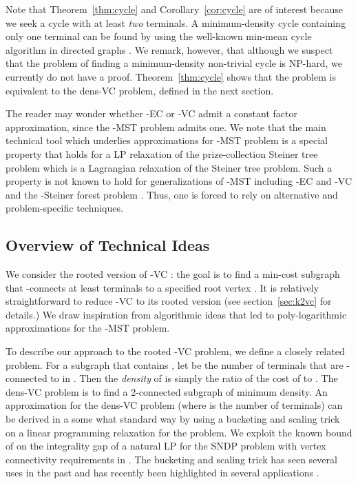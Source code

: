 \documentclass[11pt]{article}
\newcommand{\kec}[1]{-{\sc EC} }
\newcommand{\kvc}[1]{-{\sc VC} }
\newcommand{\ke}{\kec{2}}
\newcommand{\kv}{\kvc{2}}
\newcommand{\densV}{dens-{\sc VC} }
\begin{document}
Note that Theorem~\ref{thm:cycle} and Corollary~\ref{cor:cycle} are of
interest because we seek a cycle with at least {\em two} terminals.  A
minimum-density cycle containing only one terminal can be found by
using the well-known min-mean cycle algorithm in directed graphs
\cite{networkflows_book}.  We remark, however, that although we
suspect that the problem of finding a minimum-density non-trivial
cycle is NP-hard, we currently do not have a proof.
Theorem~\ref{thm:cycle} shows that the problem is equivalent to the
\densV problem, defined in the next section.

\smallskip
{} The reader may wonder whether \ke or \kv admit
a constant factor approximation, since the -MST problem admits one.
We note that the main technical tool which underlies 
approximations for -MST problem \cite{BlumRV96,Garg96,ChudakRW} is
a special property that holds for a LP relaxation of the
prize-collection Steiner tree problem \cite{GoemansW96} which is a
Lagrangian relaxation of the Steiner tree problem. Such a property is
not known to hold for generalizations of -MST including \ke and \kv
and the -Steiner forest problem \cite{HajiaghayiJ}. Thus, one is
forced to rely on alternative and problem-specific techniques.


\subsection{Overview of Technical Ideas}
We consider the rooted version of \kv: the goal is to find a min-cost
subgraph that -connects at least  terminals to a specified root
vertex . It is relatively straightforward to reduce \kv to its
rooted version (see section~\ref{sec:k2vc} for details.)  We draw
inspiration from algorithmic ideas that led to poly-logarithmic
approximations for the -MST problem. 

To describe our approach to the rooted \kv problem, we define a
closely related problem. For a subgraph  that contains , let
 be the number of terminals that are -connected to  in
. Then the {\em density} of  is simply the ratio of the cost of
 to . The \densV problem is to find a 2-connected subgraph of
minimum density. An  approximation for the \densV
problem (where  is the number of terminals) can be derived in a
some what standard way by using a bucketing and scaling trick on a
linear programming relaxation for the problem. We exploit the known
bound of  on the integrality gap of a natural LP for the SNDP
problem with vertex connectivity requirements in 
\cite{FleischerJW}.  The bucketing and scaling trick has seen several
uses in the past and has recently been highlighted in several
applications \cite{ChekuriHKS06,ChekuriHKS07,ChekuriEGS08}.
\end{document}
